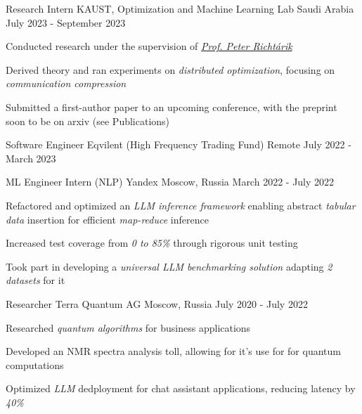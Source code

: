
\begin{cventries}
  \cventry
    {Research Intern}
    {KAUST, Optimization and Machine Learning Lab}
    {Saudi Arabia}
    {July 2023 - September 2023}
    {
      \begin{cvitems}
        \item {Conducted research under the supervision of  \href{https://richtarik.org/}{\textit{Prof. Peter Richtárik}}}
        \item {Derived theory and ran experiments on \textit{distributed optimization}, focusing on \textit{communication compression}}
        \item {Submitted a first-author paper to an upcoming conference, with the preprint soon to be on arxiv (see Publications)}
      \end{cvitems}
    }

  \cventry
    {Software Engineer}
    {Eqvilent (High Frequency Trading Fund)}
    {Remote}
    {July 2022 - March 2023}
    {}

  \cventry
    {ML Engineer Intern (NLP)}
    {Yandex}
    {Moscow, Russia}
    {March 2022 - July 2022}
    {
      \begin{cvitems} %
        \item {Refactored and optimized an \textit{LLM inference framework} enabling abstract \textit{tabular data} insertion for efficient \textit{map-reduce} inference}
        \item {Increased test coverage from \textit{0 to 85\%} through rigorous unit testing}
        \item {Took part in developing a \textit{universal LLM benchmarking solution} adapting \textit{2 datasets} for it}
      \end{cvitems}
    }
    
  \cventry
    {Researcher} %
    {Terra Quantum AG} %
    {Moscow, Russia} %
    {July 2020 - July 2022} %
    {
      \begin{cvitems} %
        \item { Researched \textit{quantum algorithms} for business applications }
        \item { Developed an {NMR spectra} analysis toll, allowing for it's use for  for quantum computations }
        \item { Optimized \textit{LLM} dedployment for chat assistant applications, reducing latency by \textit{40\%} }
      \end{cvitems}
    }
    
\end{cventries}
